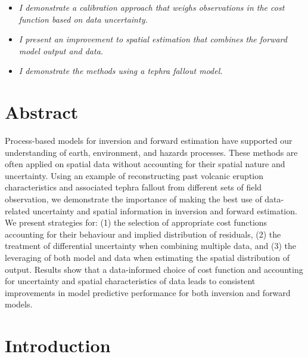\begin{small}
\begin{itemize}
\item \textsl{I demonstrate a calibration approach that weighs observations in the cost function based on data uncertainty.}

\item \textsl{I present an improvement to spatial estimation that combines the forward model output and data.}

\item \textsl{I demonstrate the methods using a tephra fallout model.}
\end{itemize}


\endgroup
\vspace*{\fill}




\end{small}
\clearpage
\section{Abstract}

Process-based models for inversion and forward estimation have supported our understanding of earth, environment, and hazards processes. These methods are often applied on spatial data without accounting for their spatial nature and uncertainty. Using an example of reconstructing past volcanic eruption characteristics and associated tephra fallout from different sets of field observation, we demonstrate the importance of making the best use of data-related uncertainty and spatial information in inversion and forward estimation. We present strategies for: (1) the selection of appropriate cost functions accounting for their behaviour and implied distribution of residuals, (2) the treatment of differential uncertainty when combining multiple data, and (3) the leveraging of both model and data when estimating the spatial distribution of output. Results show that a data-informed choice of cost function and accounting for uncertainty and spatial characteristics of data leads to consistent improvements in model predictive performance for both inversion and forward models. %




\section{Introduction}\label{section-intro}


